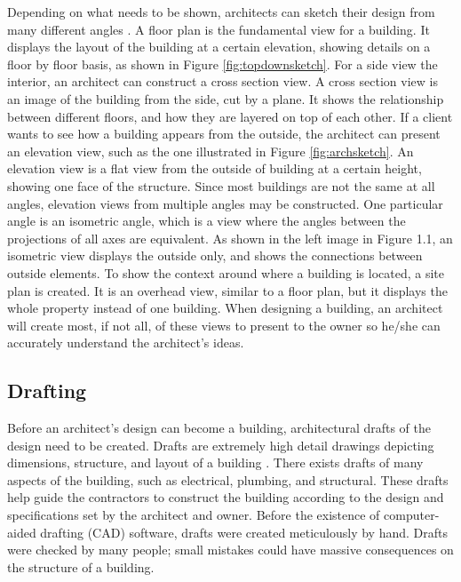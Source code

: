 Depending on what needs to be shown, architects can sketch their design from many different angles \cite{drafting_and_design}. A floor plan is the fundamental view for a building. It displays the layout of the building at a certain elevation, showing details on a floor by floor basis, as shown in Figure \ref{fig:topdownsketch}. For a side view the interior, an architect can construct a cross section view. A cross section view is an image of the building from the side, cut by a plane. It shows the relationship between different floors, and how they are layered on top of each other. If a client wants to see how a building appears from the outside, the architect can present an elevation view, such as the one illustrated in Figure \ref{fig:archsketch}. An elevation view is a flat view from the outside of building at a certain height, showing one face of the structure. Since most buildings are not the same at all angles, elevation views from multiple angles may be constructed. One particular angle is an isometric angle, which is a view where the angles between the projections of all axes are equivalent. As shown in the left image in Figure 1.1, an isometric view displays the outside only, and shows the connections between outside elements. To show the context around where a building is located, a site plan is created. It is an overhead view, similar to a floor plan, but it displays the whole property instead of one building. When designing a building, an architect will create most, if not all, of these views to present to the owner so he/she can accurately understand the architect's ideas.

\subsection{Drafting}

Before an architect's design can become a building, architectural drafts of the design need to be created. Drafts are extremely high detail drawings depicting dimensions, structure, and layout of a building \cite{drafting_and_design}. There exists drafts of many aspects of the building, such as electrical, plumbing, and structural. These drafts help guide the contractors to construct the building according to the design and specifications set by the architect and owner. Before the existence of computer-aided drafting (CAD) software, drafts were created meticulously by hand. Drafts were checked by many people; small mistakes could have massive consequences on the structure of a building. 

